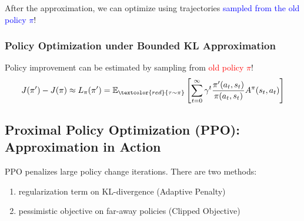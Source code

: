 \documentclass{article}
\begin{document}
    After the approximation, we can optimize using trajectories \textcolor{blue}{sampled from the old policy $\pi$}!
    \begin{thmbox}
        \subsubsection*{Policy Optimization under Bounded KL Approximation}
        Policy improvement can be estimated by sampling from \textcolor{red}{old policy $\pi$}!
        \begin{equation*}
            J(\pi') - J(\pi) \approx L_{\pi}(\pi') 
            = \mathbb{E}_{\textcolor{red}{\tau \sim \pi}} \left[ \sum_{t = 0}^{\infty} \gamma^{t} \frac{\pi'(a_t, s_t)}{\pi(a_t, s_t)} A^{\pi}(s_t, a_t) \right]
        \end{equation*}
    \end{thmbox}

\subsection{Proximal Policy Optimization (PPO): Approximation in Action}
PPO penalizes large policy change iterations. There are two methods: 
\begin{enumerate}
\item regularization term on KL-divergence (Adaptive Penalty)
\item pessimistic objective on far-away policies (Clipped Objective)
\end{enumerate}
\end{document}
